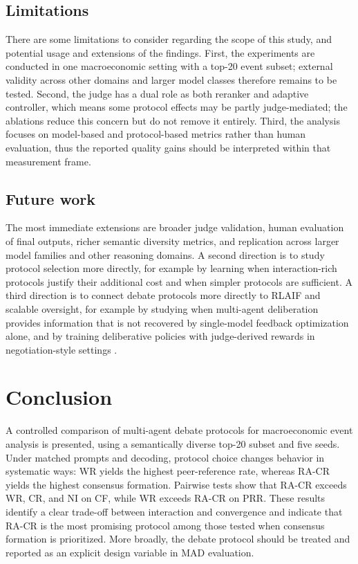 \documentclass[11pt]{article}
\begin{document}
\subsection{Limitations}

There are some limitations to consider regarding the scope of this study, and potential usage and extensions of the findings. First, the experiments are conducted in one macroeconomic setting with a top-20 event subset; external validity across other domains and larger model classes therefore remains to be tested. Second, the judge has a dual role as both reranker and adaptive controller, which means some protocol effects may be partly judge-mediated; the ablations reduce this concern but do not remove it entirely. Third, the analysis focuses on model-based and protocol-based metrics rather than human evaluation, thus the reported quality gains should be interpreted within that measurement frame.

\subsection{Future work}
The most immediate extensions are broader judge validation, human evaluation of final outputs, richer semantic diversity metrics, and replication across larger model families and other reasoning domains. A second direction is to study protocol selection more directly, for example by learning when interaction-rich protocols justify their additional cost and when simpler protocols are sufficient. A third direction is to connect debate protocols more directly to RLAIF and scalable oversight, for example by studying when multi-agent deliberation provides information that is not recovered by single-model feedback optimization alone, and by training deliberative policies with judge-derived rewards in negotiation-style settings \citep{young2026knowledge,anantaprayoon2026learning}.

\section{Conclusion}
A controlled comparison of multi-agent debate protocols for macroeconomic event analysis is presented, using a semantically diverse top-20 subset and five seeds. Under matched prompts and decoding, protocol choice changes behavior in systematic ways: WR yields the highest peer-reference rate, whereas RA-CR yields the highest consensus formation. Pairwise tests show that RA-CR exceeds WR, CR, and NI on CF, while WR exceeds RA-CR on PRR. These results identify a clear trade-off between interaction and convergence and indicate that RA-CR is the most promising protocol among those tested when consensus formation is prioritized. More broadly, the debate protocol should be treated and reported as an explicit design variable in MAD evaluation.
\end{document}
